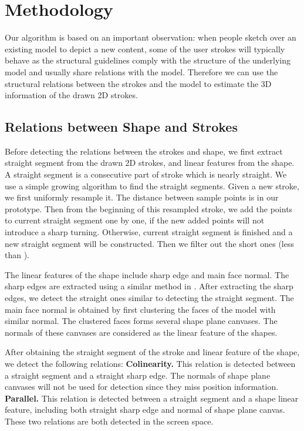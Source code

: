 \section{Methodology}

Our algorithm is based on an important observation: when people sketch over an existing model to depict a new content, some of the user strokes will typically behave as the structural guidelines comply with the structure of the underlying model and usually share relations with the model. Therefore we can use the structural relations between the strokes and the model to estimate the 3D information of the drawn 2{D} strokes. 


\subsection{Relations between Shape and Strokes}

Before detecting the relations between the strokes and shape, we first extract straight segment from the drawn 2D strokes, and linear features from the shape. A straight segment is a consecutive part of stroke which is nearly straight. We use a simple growing algorithm to find the straight segments. Given a new stroke, we first uniformly resample it. The distance between sample points is \ca{10px} in our prototype. Then from the beginning of this resampled stroke, we add the points to current straight segment one by one, if the new added points will not introduce a sharp turning. Otherwise, current straight segment is finished and a new straight segment will be constructed. Then we filter out the short ones (less than \ca{50px}).

The linear features of the shape include sharp edge and main face normal. The sharp edges are extracted using a similar method in \ca{[Iwire]}. After extracting the sharp edges, we detect the straight ones similar to detecting the straight segment. The main face normal is obtained by first clustering the faces of the model with similar normal. The clustered faces forms several shape plane canvases. The normals of these canvases are considered as the linear feature of the shapes.

%
After obtaining the straight segment of the stroke and linear feature of the shape, we detect the following relations:
\textbf{Colinearity.} This relation is detected between a straight segment and a straight sharp edge. The normals of shape plane canvases will not be used for detection since they miss position information.
\textbf{Parallel.} This relation is detected between a straight segment and a shape linear feature, including both straight sharp edge and normal of shape plane canvas.
These two relations are both detected in the screen space.

